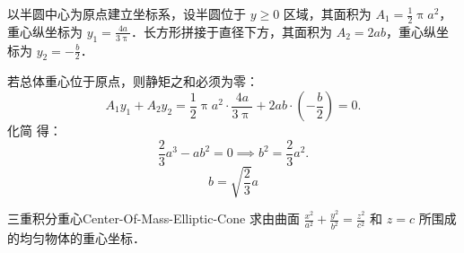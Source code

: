 \begin{solution}
    以半圆中心为原点建立坐标系，设半圆位于 $y \ge 0$ 区域，其面积为 $A_1 = \frac{1}{2} \uppi a^2$，重心纵坐标为 $y_1 = \frac{4a}{3\uppi}$．长方形拼接于直径下方，其面积为 $A_2 = 2ab$，重心纵坐标为 $y_2 = -\frac{b}{2}$．

    \begin{center}
    \end{center}

    若总体重心位于原点，则静矩之和必须为零：
    \begin{equation}\label{eq:center-balance}
        A_1 y_1 + A_2 y_2 = \frac{1}{2} \uppi a^2 \cdot \frac{4a}{3\uppi} + 2ab \cdot \left( -\frac{b}{2} \right) = 0.
    \end{equation}
    化简  得：
    \begin{equation}\label{eq:solve-b}
        \frac{2}{3} a^3 - ab^2 = 0 \implies b^2 = \frac{2}{3} a^2.
    \end{equation}
    \begin{equation}
        \boxed{b = \sqrt{\frac{2}{3}} a}
    \end{equation}
\end{solution}

\begin{problem}{三重积分重心}{Center-Of-Mass-Elliptic-Cone}
    求由曲面 $\frac{x^2}{a^2} + \frac{y^2}{b^2} = \frac{z^2}{c^2}$ 和 $z = c$ 所围成的均匀物体的重心坐标．
\end{problem}

